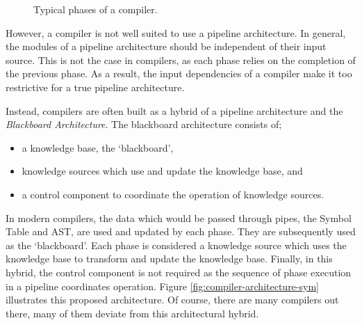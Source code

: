 \begin{figure}[H]
    \centering
{}
\caption{Typical phases of a compiler.}
\label{fig:compiler-architecture}
\end{figure}

However, a compiler is not well suited to use a pipeline architecture.
In general, the modules of a pipeline architecture should be independent of their input source.
This is not the case in compilers, as each phase relies on the completion of the previous phase.
As a result, the input dependencies of a compiler make it too restrictive for a true pipeline architecture.

Instead, compilers are often built as a hybrid of a pipeline architecture and the \textsl{Blackboard Architecture}.
The blackboard architecture consists of;
\begin{itemize}
    \item a knowledge base, the `blackboard',
    \item knowledge sources which use and update the knowledge base, and
    \item a control component to coordinate the operation of knowledge sources.
\end{itemize}

In modern compilers, the data which would be passed through pipes, the Symbol Table and AST,
are used and updated by each phase.
They are subsequently used as the `blackboard'.
Each phase is considered a knowledge source which uses the knowledge base to transform and update the knowledge base.
Finally, in this hybrid, the control component is not required as the sequence of phase execution in a pipeline coordinates operation.
Figure \ref{fig:compiler-architecture-sym} illustrates this proposed architecture.
Of course, there are many compilers out there, many of them deviate from this architectural hybrid.


